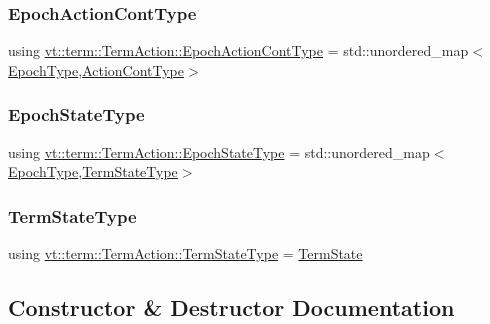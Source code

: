 \subsubsection{\texorpdfstring{Epoch\+Action\+Cont\+Type}{EpochActionContType}}
{\footnotesize\ttfamily using \hyperlink{structvt_1_1term_1_1_term_action_acefe3cb1e2a2bcf0d530082f53a2bada}{vt\+::term\+::\+Term\+Action\+::\+Epoch\+Action\+Cont\+Type} =  std\+::unordered\+\_\+map$<$\hyperlink{namespacevt_a81d11b28122d43bf9834577e4a06440f}{Epoch\+Type},\hyperlink{structvt_1_1term_1_1_term_action_a3b7ff49ce82fc33a7a1ebda8797c02b7}{Action\+Cont\+Type}$>$}

\mbox{\label{structvt_1_1term_1_1_term_action_afcbc07a9b40ff2b6d53e9522877a745d}} 
\subsubsection{\texorpdfstring{Epoch\+State\+Type}{EpochStateType}}
{\footnotesize\ttfamily using \hyperlink{structvt_1_1term_1_1_term_action_afcbc07a9b40ff2b6d53e9522877a745d}{vt\+::term\+::\+Term\+Action\+::\+Epoch\+State\+Type} =  std\+::unordered\+\_\+map$<$\hyperlink{namespacevt_a81d11b28122d43bf9834577e4a06440f}{Epoch\+Type},\hyperlink{structvt_1_1term_1_1_term_action_ae4c635b69751d887666814700ed64d65}{Term\+State\+Type}$>$}

\mbox{\label{structvt_1_1term_1_1_term_action_ae4c635b69751d887666814700ed64d65}} 
\subsubsection{\texorpdfstring{Term\+State\+Type}{TermStateType}}
{\footnotesize\ttfamily using \hyperlink{structvt_1_1term_1_1_term_action_ae4c635b69751d887666814700ed64d65}{vt\+::term\+::\+Term\+Action\+::\+Term\+State\+Type} =  \hyperlink{structvt_1_1term_1_1_term_state}{Term\+State}}



\subsection{Constructor \& Destructor Documentation}
\mbox{\label{structvt_1_1term_1_1_term_action_ac0b0f4271452cfbea674c6a7c4f50a4b}} 
